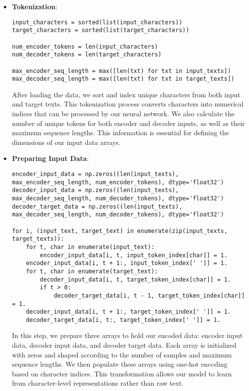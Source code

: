 \documentclass{article}
\begin{document}
\begin{itemize}
    \item \textbf{Tokenization}:
    \begin{verbatim}
input_characters = sorted(list(input_characters))
target_characters = sorted(list(target_characters))

num_encoder_tokens = len(input_characters)
num_decoder_tokens = len(target_characters)

max_encoder_seq_length = max([len(txt) for txt in input_texts])
max_decoder_seq_length = max([len(txt) for txt in target_texts])
    \end{verbatim}
    After loading the data, we sort and index unique characters from both input and target texts. This tokenization process converts characters into numerical indices that can be processed by our neural network. We also calculate the number of unique tokens for both encoder and decoder inputs, as well as their maximum sequence lengths. This information is essential for defining the dimensions of our input data arrays.



    \item \textbf{Preparing Input Data}:
    \begin{verbatim}
encoder_input_data = np.zeros((len(input_texts), max_encoder_seq_length, num_encoder_tokens), dtype='float32')
decoder_input_data = np.zeros((len(input_texts), max_decoder_seq_length, num_decoder_tokens), dtype='float32')
decoder_target_data = np.zeros((len(input_texts), max_decoder_seq_length, num_decoder_tokens), dtype='float32')

for i, (input_text, target_text) in enumerate(zip(input_texts, target_texts)):
    for t, char in enumerate(input_text):
        encoder_input_data[i, t, input_token_index[char]] = 1.
    encoder_input_data[i, t + 1:, input_token_index[' ']] = 1.
    for t, char in enumerate(target_text):
        decoder_input_data[i, t, target_token_index[char]] = 1.
        if t > 0:
            decoder_target_data[i, t - 1, target_token_index[char]] = 1.
    decoder_input_data[i, t + 1:, target_token_index[' ']] = 1.
    decoder_target_data[i, t:, target_token_index[' ']] = 1.
    \end{verbatim}
    
In this step, we prepare three arrays to hold our encoded data: encoder input data, decoder input data, and decoder target data. Each array is initialized with zeros and shaped according to the number of samples and maximum sequence lengths. We then populate these arrays using one-hot encoding based on character indices. This transformation allows our model to learn from character-level representations rather than raw text.




\end{itemize}
\end{document}
